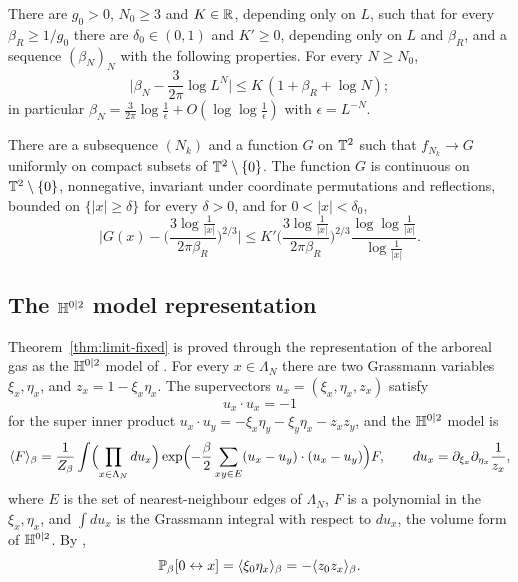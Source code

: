 \documentclass[11pt]{amsart}
\numberwithin{equation}{section}
\numberwithin{theorem}{section}
\newcommand{\conn}{\leftrightarrow}
\begin{document}
\begin{theorem}\label{thm:limit-fixed}
There are $g_0>0$, $N_0\ge3$ and $K\in\mathbb{R}$, depending only on $L$, such that for every $\beta_R\ge1/g_0$ there are $\delta_0\in(0,1)$ and $K'\ge0$, depending only on $L$ and $\beta_R$, and a sequence
$(\beta_N)_N$ with the following properties.
For every $N\ge N_0$,
\begin{equation} \label{e:betaN}
    \bigl|\beta_N-\frac3{2\pi}\log L^N\bigr|\le K\,(1+\beta_R+\log N);
\end{equation}
in particular $\beta_N=\frac3{2\pi}\log\frac1\epsilon+O(\log\log\frac1\epsilon)$ with $\epsilon=L^{-N}$.

There are a subsequence $(N_k)$ and a function $G$ on $\mathbb{T}^2$ such that $f_{N_k}\to G$
uniformly on compact subsets of $\mathbb{T}^2\setminus\{0\}$. The function $G$ is continuous on
$\mathbb{T}^2\setminus\{0\}$, nonnegative, invariant under coordinate
permutations and reflections, bounded on $\{|x|\ge\delta\}$ for every $\delta>0$, and for
$0<|x|<\delta_0$,
\begin{equation}
    \Biggl|G(x)-\Biggl(\frac{3\log\frac1{|x|}}{2\pi\beta_R}\Biggr)^{2/3}\Biggr|
    \le K'\Biggl(\frac{3\log\frac1{|x|}}{2\pi\beta_R}\Biggr)^{2/3}\frac{\log\log\frac1{|x|}}{\log\frac1{|x|}}.
\end{equation}
\end{theorem}

\subsection{\texorpdfstring{The $\mathbb{H}^{0|2}$ model representation}{The H02 model representation}}
Theorem~\ref{thm:limit-fixed} is proved through the representation of the arboreal gas as the
$\mathbb{H}^{0|2}$ model of \cite{BCH24}. For every $x\in\Lambda_N$ there are two Grassmann variables
$\xi_x,\eta_x$, and $z_x=1-\xi_x\eta_x$. The supervectors $u_x=(\xi_x,\eta_x,z_x)$ satisfy
\begin{equation}
  u_x\cdot u_x=-1
\end{equation}
for the super inner product $u_x\cdot u_y=-\xi_x\eta_y-\xi_y\eta_x-z_xz_y$, and
the $\mathbb{H}^{0|2}$ model is
\begin{equation}\label{e:H02-def}
  \langle F \rangle_{\beta}=\frac{1}{Z_{\beta}}\int\Bigl(\prod_{x\in\Lambda_N}du_x\Bigr)
  \exp\Bigl(-\frac\beta2\sum_{xy\in E}(u_x-u_y)\cdot(u_x-u_y)\Bigr)F,
  \qquad du_x=\partial_{\xi_x}\partial_{\eta_x}\frac1{z_x},
\end{equation}
where $E$ is the set of nearest-neighbour edges of $\Lambda_N$, $F$ is a polynomial in the
$\xi_x,\eta_x$, and $\int du_x$ is the Grassmann integral with respect to $du_x$, the volume form
of $\mathbb{H}^{0|2}$. By \cite{BCH24},
\begin{equation}\label{e:P}
  \P_\beta[0\conn x]=\avg{\xi_0\eta_x}_{\beta}=-\avg{z_0z_x}_{\beta}.
\end{equation}
\end{document}
